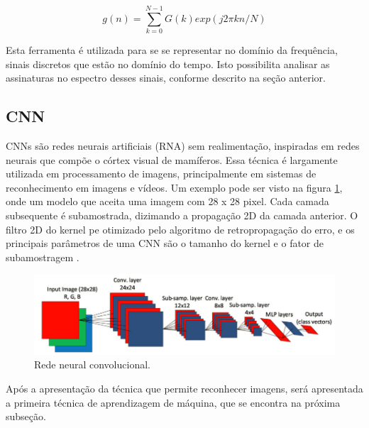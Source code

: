 \begin{equation}\label{eq:dft}
    g(n)=\sum_{k=0}^{N-1} G(k)exp(j2\pi kn/N)
\end{equation}

Esta ferramenta é utilizada para se se representar no domínio da frequência, sinais discretos que estão no domínio do tempo. Isto 
possibilita analisar as assinaturas no espectro desses sinais, conforme descrito na seção anterior.


% 

\subsection{CNN}

CNNs são redes neurais artificiais (RNA) sem realimentação, inspiradas em redes neurais que compõe o córtex visual de mamíferos. Essa
técnica é largamente utilizada em processamento de imagens, principalmente em sistemas de reconhecimento em imagens e vídeos. Um exemplo
pode ser visto na figura \ref{fig:cnn_image_ince_p5}, onde um modelo que aceita uma imagem com 28 x 28 pixel. Cada camada subsequente é
subamostrada, dizimando a propagação 2D da camada anterior. O filtro 2D do kernel pe otimizado pelo algoritmo de retropropagação do erro, 
e os principais parâmetros de uma CNN são o tamanho do kernel e o fator de subamostragem \cite{Ince2016}.

\begin{figure}[H]
    \caption{Rede neural convolucional.}
    \begin{center}
        \includegraphics[scale=.4]{referencial/img/cnn_image_ince_p5.png}
    \end{center}
    \label{fig:cnn_image_ince_p5}
\end{figure}

Após a apresentação da técnica que permite reconhecer imagens, será apresentada a primeira técnica de aprendizagem de máquina, que se
encontra na próxima subseção.


